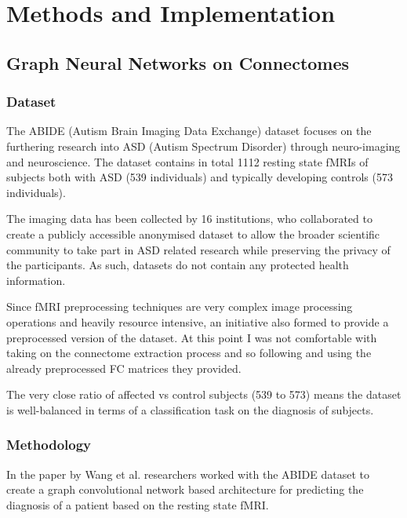 \chapter{Methods and Implementation}

\section{Graph Neural Networks on Connectomes}

	\subsection{Dataset}
	\label{sec:ABIDE}
	
	The ABIDE (Autism Brain Imaging Data Exchange) dataset\cite{di2014autism} focuses on the furthering research into ASD (Autism Spectrum Disorder) through neuro-imaging and neuroscience. The dataset contains in total 1112 resting state fMRIs of subjects both with ASD (539 individuals) and typically developing controls (573 individuals). 
	
	The imaging data has been collected by 16 institutions, who collaborated to create a publicly accessible anonymised dataset to allow the broader scientific community to take part in ASD related research while preserving the privacy of the participants. As such, datasets do not contain any protected health information. 
	
	Since fMRI preprocessing techniques are very complex image processing operations and heavily resource intensive, an initiative also formed to provide a preprocessed version of the dataset. At this point I was not comfortable with taking on the connectome extraction process and so following \cite{wang2021graph} and using the already preprocessed FC matrices they provided.
	
	The very close ratio of affected vs control subjects (539 to 573) means the dataset is well-balanced in terms of a classification task on the diagnosis of subjects. 
	
	\subsection{Methodology}
	In the paper \cite{wang2021graph} by Wang et al. researchers worked with the ABIDE dataset to create a graph convolutional network based architecture for predicting the diagnosis of a patient based on the resting state fMRI. 
	
